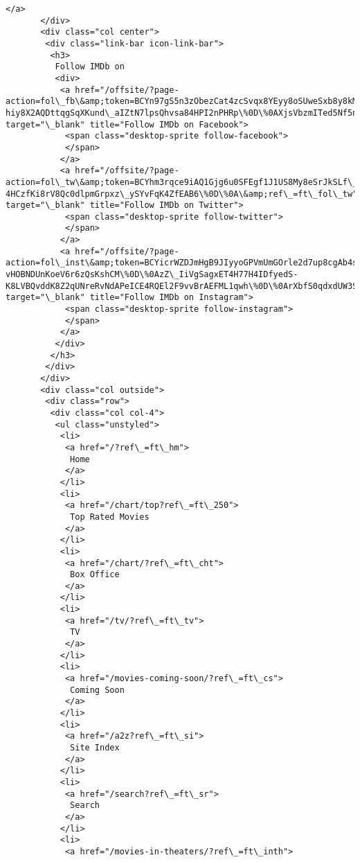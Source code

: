 \documentclass[11pt]{article}
\begin{document}
\begin{Verbatim}[commandchars=\\\{\}]
        </a>
       </div>
       <div class="col center">
        <div class="link-bar icon-link-bar">
         <h3>
          Follow IMDb on
          <div>
           <a href="/offsite/?page-action=fol\_fb\&amp;token=BCYn97gS5n3zObezCat4zcSvqx8YEyy8oSUweSxb8y8kMIqvRjpGKPk0aQpp1RyaSoUKMCcrT2CK\%0D\%0AgDYZpTeG5rarTSd\_8T9riFBY24kHz-hiy8X2AQDttqgSqXKund\_aIZtN7lpsQhvsa84HPI2nPHRp\%0D\%0AXjsVbzmITed5Nf5n2wq7SXKgKGn5gNG2tS74PGwz09NG\%0D\%0A\&amp;ref\_=ft\_fol\_fb" target="\_blank" title="Follow IMDb on Facebook">
            <span class="desktop-sprite follow-facebook">
            </span>
           </a>
           <a href="/offsite/?page-action=fol\_tw\&amp;token=BCYhm3rqce9iAQ1Gjg6u0SFEgf1J1US8My8eSrJkSLf\_aR3D321lJMTK\_dF0GGvWN8uSrBtTpLes\%0D\%0AvdbZ1PKeKpkQ\_kgZT3NvZ21tNdcYr8jGdc\_mDHeN7SHHEuL\_eedQbOk7gUQwZt7HAcATRll3D93i\%0D\%0AEiVnI-4HCzfKi8rV8Qc0dlpmGrpxz\_ySYvFqK4ZfEAB6\%0D\%0A\&amp;ref\_=ft\_fol\_tw" target="\_blank" title="Follow IMDb on Twitter">
            <span class="desktop-sprite follow-twitter">
            </span>
           </a>
           <a href="/offsite/?page-action=fol\_inst\&amp;token=BCYicrWZDJmHgB9JIyyoGPVmUmGOrle2d7up8cgAb4sZOF9BdW3U-vHOBNDUnKoeV6r6zQsKshCM\%0D\%0AzZ\_IiVgSagxET4H77H4IDfyedS-K8LVBQvddK8Z2qUNreRvNdAPeICE4RQEl2F9vvBrAEFML1qwh\%0D\%0ArXbfS0qdxdUW3SU2mk7f0cyZMEKYYXcP8bTd\_oOwQwgS\%0D\%0A\&amp;ref\_=ft\_fol\_inst" target="\_blank" title="Follow IMDb on Instagram">
            <span class="desktop-sprite follow-instagram">
            </span>
           </a>
          </div>
         </h3>
        </div>
       </div>
       <div class="col outside">
        <div class="row">
         <div class="col col-4">
          <ul class="unstyled">
           <li>
            <a href="/?ref\_=ft\_hm">
             Home
            </a>
           </li>
           <li>
            <a href="/chart/top?ref\_=ft\_250">
             Top Rated Movies
            </a>
           </li>
           <li>
            <a href="/chart/?ref\_=ft\_cht">
             Box Office
            </a>
           </li>
           <li>
            <a href="/tv/?ref\_=ft\_tv">
             TV
            </a>
           </li>
           <li>
            <a href="/movies-coming-soon/?ref\_=ft\_cs">
             Coming Soon
            </a>
           </li>
           <li>
            <a href="/a2z?ref\_=ft\_si">
             Site Index
            </a>
           </li>
           <li>
            <a href="/search?ref\_=ft\_sr">
             Search
            </a>
           </li>
           <li>
            <a href="/movies-in-theaters/?ref\_=ft\_inth">

\end{Verbatim}
\end{document}
